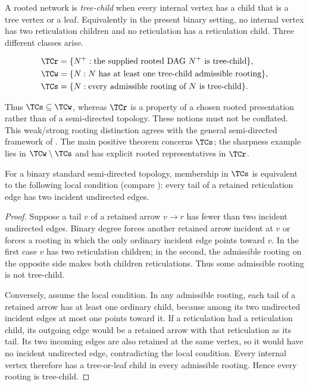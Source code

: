A rooted network is \emph{tree-child} when every internal vertex has a child that is a tree vertex or a leaf.  Equivalently in the present binary setting, no internal vertex has two reticulation children and no reticulation has a reticulation child.  Three different classes arise.

\begin{definition}
\begin{align*}
\TCr&=\{N^+:\text{the supplied rooted DAG }N^+\text{ is tree-child}\},\\
\TCw&=\{N:\text{$N$ has at least one tree-child admissible rooting}\},\\
\TCs&=\{N:\text{every admissible rooting of $N$ is tree-child}\}.
\end{align*}
\end{definition}

Thus $\TCs\subseteq\TCw$, whereas $\TCr$ is a property of a chosen rooted presentation rather than of a semi-directed topology.  These notions must not be conflated.  This weak/strong rooting distinction agrees with the general semi-directed framework of \textcite{HoltgrefeEtAl2026}.  The main positive theorem concerns $\TCs$; the sharpness example lies in $\TCw\setminus\TCs$ and has explicit rooted representatives in $\TCr$.

\begin{lemma}\label{lem:local-strong}
For a binary standard semi-directed topology, membership in $\TCs$ is equivalent to the following local condition (compare \cite[Theorem~5]{HoltgrefeEtAl2026}): every tail of a retained reticulation edge has two incident undirected edges.
\end{lemma}

\begin{proof}
Suppose a tail $v$ of a retained arrow $v\to r$ has fewer than two incident undirected edges.  Binary degree forces another retained arrow incident at $v$ or forces a rooting in which the only ordinary incident edge points toward $v$.  In the first case $v$ has two reticulation children; in the second, the admissible rooting on the opposite side makes both children reticulations.  Thus some admissible rooting is not tree-child.

Conversely, assume the local condition.  In any admissible rooting, each tail of a retained arrow has at least one ordinary child, because among its two undirected incident edges at most one points toward it.  If a reticulation had a reticulation child, its outgoing edge would be a retained arrow with that reticulation as its tail.  Its two incoming edges are also retained at the same vertex, so it would have no incident undirected edge, contradicting the local condition.  Every internal vertex therefore has a tree-or-leaf child in every admissible rooting.  Hence every rooting is tree-child.
\end{proof}

